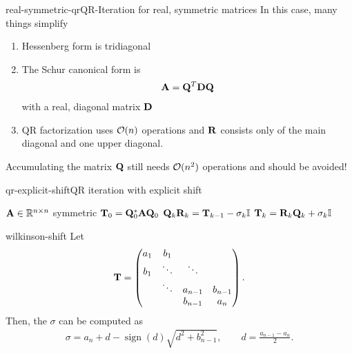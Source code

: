 
\begin{Remark*}{real-symmetric-qr}{QR-Iteration for real, symmetric matrices}
  In this case, many things simplify
  \begin{enumerate}
  \item Hessenberg form is tridiagonal
  \item The Schur canonical form is
    \begin{gather}
      \mathbf A = \mathbf Q^T\mathbf D\mathbf Q
    \end{gather}
    with a real, diagonal matrix $\mathbf D$
  \item QR factorization uses $\mathcal O(n)$ operations and $\mathbf R$
    consists only of the main diagonal and one upper diagonal.
  \end{enumerate}
  Accumulating the matrix $\mathbf Q$ still needs $\mathcal O(n^2)$ operations and should be avoided!
\end{Remark*}

\begin{Algorithm*}{qr-explicit-shift}{QR iteration with explicit shift}
  \begin{algorithmic}[1]
    \Require $\mathbf A\in\mathbb R^{n\times n}$ symmetric
    \State $\mathbf T_0 = \mathbf Q_0^*\mathbf A\mathbf Q_0$
    \State $\mathbf Q_k\mathbf R_k = \mathbf T_{k-1} - \sigma_k\mathbb I$
    \State $\mathbf T_{k} = \mathbf R_k\mathbf Q_k + \sigma_k\mathbb I$
    \EndFor
  \end{algorithmic}
\end{Algorithm*}

\begin{Lemma}{wilkinson-shift}
  Let
  \begin{gather}
    \mathbf T =
    \begin{pmatrix}
      a_1&b_1\\
      b_1&\ddots&\ddots\\
      &\ddots&a_{n-1}&b_{n-1}\\
      &&b_{n-1}&a_n
    \end{pmatrix}.
  \end{gather}
  Then, the  $\sigma$ can be computed as
  \begin{gather}
    \sigma = a_n + d - \operatorname{sign}(d) \sqrt{d^2+b_{n-1}^2},
    \qquad d=\frac{a_{n-1}-a_n}2.
  \end{gather}
\end{Lemma}


